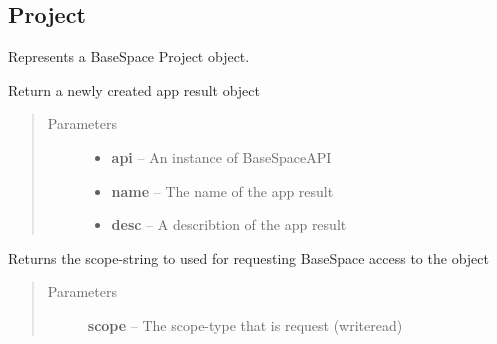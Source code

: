 \documentclass[letterpaper,10pt,english]{sphinxmanual}
\begin{document}
\subsection{Project}
\label{Available modules:project}

\begin{fulllineitems}
\label{Available modules:BaseSpacePy.model.Project.Project}
Represents a BaseSpace Project object.

\begin{fulllineitems}
\label{Available modules:BaseSpacePy.model.Project.Project.createAppResult}
Return a newly created app result object
\begin{quote}\begin{description}
\item[{Parameters}] \leavevmode\begin{itemize}
\item {} 
\textbf{api} -- An instance of BaseSpaceAPI

\item {} 
\textbf{name} -- The name of the app result

\item {} 
\textbf{desc} -- A describtion of the app result

\end{itemize}

\end{description}\end{quote}

\end{fulllineitems}


\begin{fulllineitems}
\label{Available modules:BaseSpacePy.model.Project.Project.getAccessStr}
Returns the scope-string to used for requesting BaseSpace access to the object
\begin{quote}\begin{description}
\item[{Parameters}] \leavevmode
\textbf{scope} -- The scope-type that is request (write\textbar{}read)


\end{description}
\end{quote}
\end{fulllineitems}
\end{fulllineitems}
\end{document}
